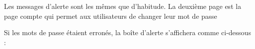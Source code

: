 \documentclass{article}
\begin{document}
\begin{enumerate}
               Les messages d'alerte sont les mêmes que d'habitude. La deuxième page est la page compte qui permet aux utilisateurs de changer leur mot de passe
  
  \vspace{0.7cm}
   
\hspace*{-0.7in}
               \noindent{}  
               
 
  Si les mots de passe étaient erronés, la boîte d'alerte s'affichera comme ci-dessous :
  
   
  \vspace{0.7cm}
   
\hspace*{-0.7in}

               \noindent{}  
               

\end{enumerate}
\end{document}

